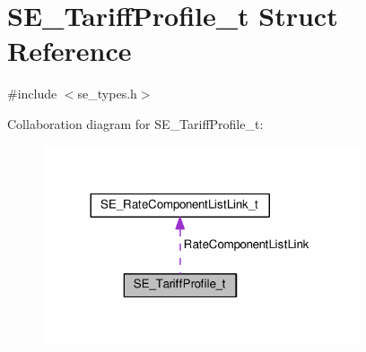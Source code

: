 \hypertarget{structSE__TariffProfile__t}{}\section{S\+E\+\_\+\+Tariff\+Profile\+\_\+t Struct Reference}
\label{structSE__TariffProfile__t}


{\ttfamily \#include $<$se\+\_\+types.\+h$>$}



Collaboration diagram for S\+E\+\_\+\+Tariff\+Profile\+\_\+t\+:\nopagebreak
\begin{figure}[H]
\begin{center}
\leavevmode
\includegraphics[width=264pt]{structSE__TariffProfile__t__coll__graph}
\end{center}
\end{figure}
